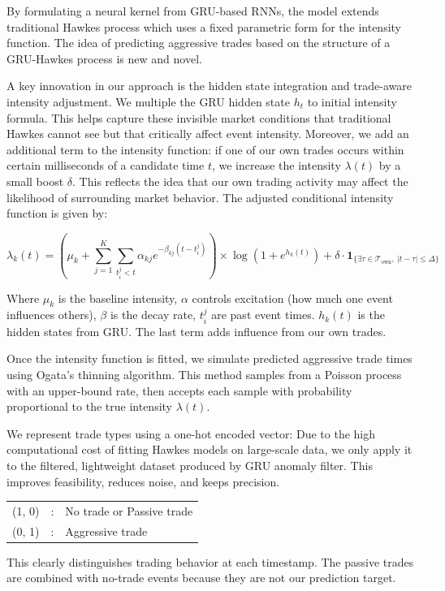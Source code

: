By formulating a neural kernel from GRU-based RNNs, the model extends traditional Hawkes process which uses a fixed parametric form for the intensity function. The idea of predicting aggressive trades based on the structure of a GRU-Hawkes process is new and novel.


A key innovation in our approach is the hidden state integration and trade-aware intensity adjustment. We multiple the GRU hidden state $h_t$ to initial intensity formula. This helps capture these invisible market conditions that traditional Hawkes cannot see but that critically affect event intensity. Moreover, we add an additional term to the intensity function: if one of our own trades occurs within certain milliseconds of a candidate time $t$, we increase the intensity $\lambda(t)$ by a small boost $\delta$. This reflects the idea that our own trading activity may affect the likelihood of surrounding market behavior. The adjusted conditional intensity function is given by:

\begin{equation}
\lambda_k(t) = (\mu_k + \sum_{j=1}^{K} \sum_{t_i^j < t} \alpha_{kj} e^{-\beta_{kj}(t - t_i^j)}) \times \log(1+e^{h_k(t)}) + \delta \cdot \mathbf{1}_{\{\exists \tau \in \mathcal{T}_{\text{own}},\ |t - \tau| \leq \Delta \}}
\end{equation}

Where $\mu_k$ is the baseline intensity, $\alpha$ controls excitation (how much one event influences others), $\beta$ is the decay rate, $t_i^j$ are past event times. $h_k(t)$ is the hidden states from GRU. The last term adds influence from our own trades.

Once the intensity function is fitted, we simulate predicted aggressive trade times using Ogata's thinning algorithm. This method samples from a Poisson process with an upper-bound rate, then accepts each sample with probability proportional to the true intensity $\lambda(t)$.

We represent trade types using a one-hot encoded vector:
Due to the high computational cost of fitting Hawkes models on large-scale data, we only apply it to the filtered, lightweight dataset produced by GRU anomaly filter. This improves feasibility, reduces noise, and keeps precision.
\begin{center}
\begin{tabular}{lll}
(1, 0) & : & No trade or Passive trade \\
(0, 1) & : & Aggressive trade \\
\end{tabular}
\end{center}
This clearly distinguishes trading behavior at each timestamp. The passive trades are combined with no-trade events because they are not our prediction target.


